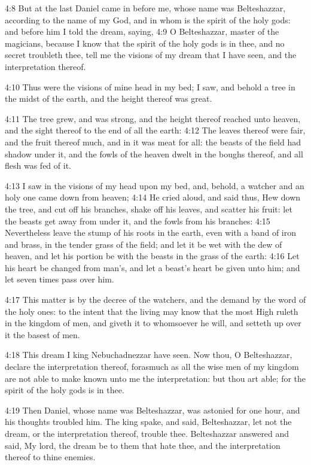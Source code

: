 4:8 But at the last Daniel came in before me, whose name was
Belteshazzar, according to the name of my God, and in whom is the
spirit of the holy gods: and before him I told the dream, saying, 4:9
O Belteshazzar, master of the magicians, because I know that the
spirit of the holy gods is in thee, and no secret troubleth thee, tell
me the visions of my dream that I have seen, and the interpretation
thereof.

4:10 Thus were the visions of mine head in my bed; I saw, and behold a
tree in the midst of the earth, and the height thereof was great.

4:11 The tree grew, and was strong, and the height thereof reached
unto heaven, and the sight thereof to the end of all the earth: 4:12
The leaves thereof were fair, and the fruit thereof much, and in it
was meat for all: the beasts of the field had shadow under it, and the
fowls of the heaven dwelt in the boughs thereof, and all flesh was fed
of it.

4:13 I saw in the visions of my head upon my bed, and, behold, a
watcher and an holy one came down from heaven; 4:14 He cried aloud,
and said thus, Hew down the tree, and cut off his branches, shake off
his leaves, and scatter his fruit: let the beasts get away from under
it, and the fowls from his branches: 4:15 Nevertheless leave the stump
of his roots in the earth, even with a band of iron and brass, in the
tender grass of the field; and let it be wet with the dew of heaven,
and let his portion be with the beasts in the grass of the earth: 4:16
Let his heart be changed from man's, and let a beast's heart be given
unto him; and let seven times pass over him.

4:17 This matter is by the decree of the watchers, and the demand by
the word of the holy ones: to the intent that the living may know that
the most High ruleth in the kingdom of men, and giveth it to
whomsoever he will, and setteth up over it the basest of men.

4:18 This dream I king Nebuchadnezzar have seen. Now thou, O
Belteshazzar, declare the interpretation thereof, forasmuch as all the
wise men of my kingdom are not able to make known unto me the
interpretation: but thou art able; for the spirit of the holy gods is
in thee.

4:19 Then Daniel, whose name was Belteshazzar, was astonied for one
hour, and his thoughts troubled him. The king spake, and said,
Belteshazzar, let not the dream, or the interpretation thereof,
trouble thee. Belteshazzar answered and said, My lord, the dream be to
them that hate thee, and the interpretation thereof to thine enemies.

